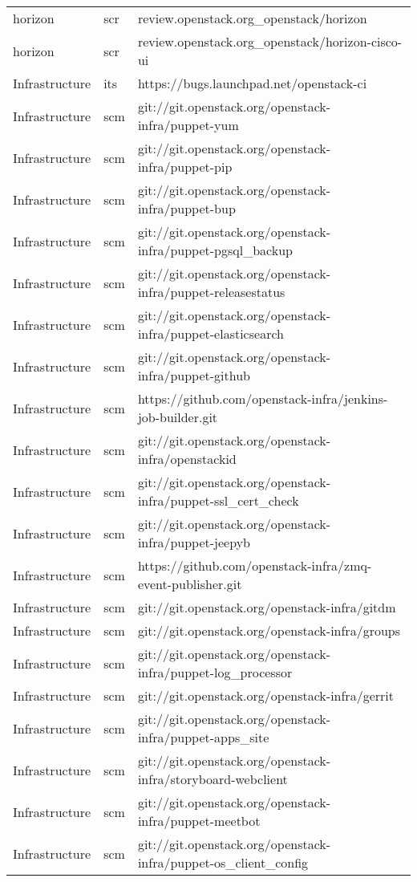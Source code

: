 \begin{center}
\begin{longtable}{|p{4cm}|p{1cm}|p{10cm}|}
horizon&scr&review.openstack.org\_openstack/horizon\\ 
horizon&scr&review.openstack.org\_openstack/horizon-cisco-ui\\ 
Infrastructure&its&https://bugs.launchpad.net/openstack-ci\\ 
Infrastructure&scm&git://git.openstack.org/openstack-infra/puppet-yum\\ 
Infrastructure&scm&git://git.openstack.org/openstack-infra/puppet-pip\\ 
Infrastructure&scm&git://git.openstack.org/openstack-infra/puppet-bup\\ 
Infrastructure&scm&git://git.openstack.org/openstack-infra/puppet-pgsql\_backup\\ 
Infrastructure&scm&git://git.openstack.org/openstack-infra/puppet-releasestatus\\ 
Infrastructure&scm&git://git.openstack.org/openstack-infra/puppet-elasticsearch\\ 
Infrastructure&scm&git://git.openstack.org/openstack-infra/puppet-github\\ 
Infrastructure&scm&https://github.com/openstack-infra/jenkins-job-builder.git\\ 
Infrastructure&scm&git://git.openstack.org/openstack-infra/openstackid\\ 
Infrastructure&scm&git://git.openstack.org/openstack-infra/puppet-ssl\_cert\_check\\ 
Infrastructure&scm&git://git.openstack.org/openstack-infra/puppet-jeepyb\\ 
Infrastructure&scm&https://github.com/openstack-infra/zmq-event-publisher.git\\ 
Infrastructure&scm&git://git.openstack.org/openstack-infra/gitdm\\ 
Infrastructure&scm&git://git.openstack.org/openstack-infra/groups\\ 
Infrastructure&scm&git://git.openstack.org/openstack-infra/puppet-log\_processor\\ 
Infrastructure&scm&git://git.openstack.org/openstack-infra/gerrit\\ 
Infrastructure&scm&git://git.openstack.org/openstack-infra/puppet-apps\_site\\ 
Infrastructure&scm&git://git.openstack.org/openstack-infra/storyboard-webclient\\ 
Infrastructure&scm&git://git.openstack.org/openstack-infra/puppet-meetbot\\ 
Infrastructure&scm&git://git.openstack.org/openstack-infra/puppet-os\_client\_config\\ 

\end{longtable}
\end{center}
